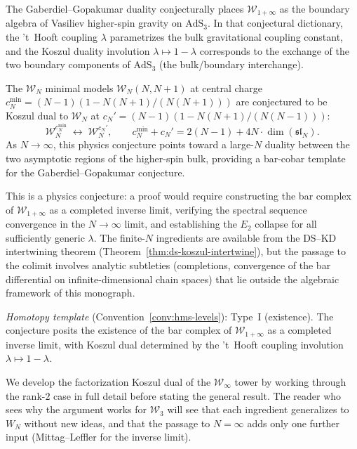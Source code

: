 \begin{remark}
\label{rem:w-infty-holography}
The Gaberdiel--Gopakumar duality \cite{GG11} conjecturally places
$\mathcal{W}_{1+\infty}$ as the boundary algebra of Vasiliev
higher-spin gravity on $\mathrm{AdS}_3$.  In that conjectural
dictionary, the 't~Hooft coupling $\lambda$ parametrizes the bulk
gravitational coupling constant, and the Koszul duality involution
$\lambda \mapsto 1 - \lambda$ corresponds to
the exchange of the two boundary components of $\mathrm{AdS}_3$
(the bulk/boundary interchange).

The $\mathcal{W}_N$ minimal models $\mathcal{W}_N(N, N{+}1)$ at
central charge $c_N^{\min} = (N-1)(1 - N(N+1)/(N(N+1)))$ are
conjectured to be Koszul dual to $\mathcal{W}_N$ at
$c_N' = (N-1)(1 - N(N+1)/(N(N-1)))$:
\[
\mathcal{W}_N^{c_N^{\min}} \;\longleftrightarrow\;
\mathcal{W}_N^{c_N'},
\qquad c_N^{\min} + c_N' = 2(N-1) + 4N \cdot \dim(\mathfrak{sl}_N).
\]
As $N \to \infty$, this physics conjecture points toward a large-$N$
duality between the
two asymptotic regions of the higher-spin bulk, providing a
bar-cobar template for the Gaberdiel--Gopakumar conjecture.

This is a physics conjecture: a proof would require constructing
the bar complex of $\mathcal{W}_{1+\infty}$ as a completed
inverse limit, verifying the spectral sequence convergence in the
$N \to \infty$ limit, and establishing the $E_2$ collapse for
all sufficiently generic $\lambda$.  The finite-$N$ ingredients
are available from the DS--KD intertwining theorem
(Theorem~\ref{thm:ds-koszul-intertwine}), but the passage to the
colimit involves analytic subtleties (completions, convergence of
the bar differential on infinite-dimensional chain spaces) that
lie outside the algebraic framework of this monograph.

\emph{Homotopy template} (Convention~\ref{conv:hms-levels}): Type~I (existence).
The conjecture posits the existence of the bar complex of $\mathcal{W}_{1+\infty}$ as a completed inverse limit, with Koszul dual determined by the 't~Hooft coupling involution $\lambda \mapsto 1 - \lambda$.
\end{remark}


We develop the factorization Koszul dual of the $\mathcal{W}_\infty$
tower by working through the rank-$2$ case in full detail before
stating the general result.  The reader who sees why the argument works
for $\mathcal{W}_3$ will see that each ingredient generalizes to
$W_N$ without new ideas, and that the passage to $N = \infty$
adds only one further input (Mittag--Leffler for the inverse limit).

